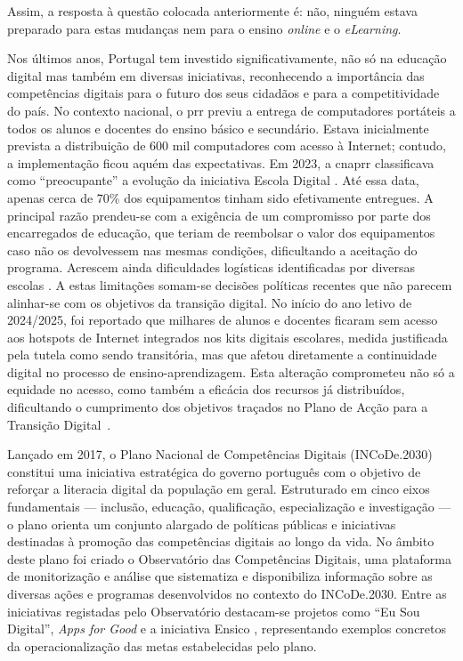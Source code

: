 Assim, a resposta à questão colocada anteriormente é: não, ninguém estava preparado para estas mudanças nem para o ensino \textit{online} e o \textit{eLearning}.

Nos últimos anos, Portugal tem investido significativamente, não só na educação digital mas também em diversas iniciativas, reconhecendo a importância das competências digitais para o futuro dos seus cidadãos e para a competitividade do país. No contexto nacional, o \acrfull{prr} previu a entrega de computadores portáteis a todos os alunos e docentes do ensino básico e secundário. Estava inicialmente prevista a distribuição de 600 mil computadores com acesso à Internet; contudo, a implementação ficou aquém das expectativas. Em 2023, a \acrfull{cnaprr} classificava como ``preocupante'' a evolução da iniciativa Escola Digital \cite{PRREntregacomputadores}. Até essa data, apenas cerca de 70\% dos equipamentos tinham sido efetivamente entregues. A principal razão prendeu-se com a exigência de um compromisso por parte dos encarregados de educação, que teriam de reembolsar o valor dos equipamentos caso não os devolvessem nas mesmas condições, dificultando a aceitação do programa. Acrescem ainda dificuldades logísticas identificadas por diversas escolas \cite{PRREntregacomputadores}. A estas limitações somam-se decisões políticas recentes que não parecem alinhar-se com os objetivos da transição digital. No início do ano letivo de 2024/2025, foi reportado que milhares de alunos e docentes ficaram sem acesso aos hotspots de Internet integrados nos kits digitais escolares, medida justificada pela tutela como sendo transitória, mas que afetou diretamente a continuidade digital no processo de ensino-aprendizagem. Esta alteração comprometeu não só a equidade no acesso, como também a eficácia dos recursos já distribuídos, dificultando o cumprimento dos objetivos traçados no Plano de Acção para a Transição Digital~\cite{ExecutiveDigest2024}.

Lançado em 2017, o Plano Nacional de Competências Digitais (INCoDe.2030)~\cite{incode2030} constitui uma iniciativa estratégica do governo português com o objetivo de reforçar a literacia digital da população em geral. Estruturado em cinco eixos fundamentais — inclusão, educação, qualificação, especialização e investigação — o plano orienta um conjunto alargado de políticas públicas e iniciativas destinadas à promoção das competências digitais ao longo da vida. No âmbito deste plano foi criado o Observatório das Competências Digitais, uma plataforma de monitorização e análise que sistematiza e disponibiliza informação sobre as diversas ações e programas desenvolvidos no contexto do INCoDe.2030. Entre as iniciativas registadas pelo Observatório destacam-se projetos como “Eu Sou Digital”, \textit{Apps for Good} e a iniciativa Ensico \cite{observatorio2030}, representando exemplos concretos da operacionalização das metas estabelecidas pelo plano.

